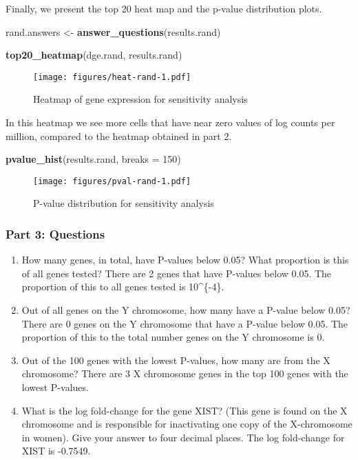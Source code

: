 \documentclass[]{article}
\newenvironment{Shaded}{\begin{snugshade}}{\end{snugshade}}
\newcommand{\KeywordTok}[1]{\textcolor[rgb]{0.13,0.29,0.53}{\textbf{{#1}}}}
\newcommand{\DataTypeTok}[1]{\textcolor[rgb]{0.13,0.29,0.53}{{#1}}}
\newcommand{\DecValTok}[1]{\textcolor[rgb]{0.00,0.00,0.81}{{#1}}}
\newcommand{\StringTok}[1]{\textcolor[rgb]{0.31,0.60,0.02}{{#1}}}
\newcommand{\NormalTok}[1]{{#1}}
\begin{document}
Finally, we present the top 20 heat map and the p-value distribution
plots.

\begin{Shaded}
\begin{Highlighting}[]
\NormalTok{rand.answers <-}\StringTok{ }\KeywordTok{answer_questions}\NormalTok{(results.rand)}
\end{Highlighting}
\end{Shaded}

\begin{Shaded}
\begin{Highlighting}[]
\KeywordTok{top20_heatmap}\NormalTok{(dge.rand, results.rand)}
\end{Highlighting}
\end{Shaded}

\begin{figure}[htbp]
\centering
\texttt{[image: figures/heat-rand-1.pdf]}
\caption{Heatmap of gene expression for sensitivity analysis}
\end{figure}

In this heatmap we see more cells that have near zero values of log
counts per million, compared to the heatmap obtained in part 2.

\begin{Shaded}
\begin{Highlighting}[]
\KeywordTok{pvalue_hist}\NormalTok{(results.rand, }\DataTypeTok{breaks =} \DecValTok{150}\NormalTok{)}
\end{Highlighting}
\end{Shaded}

\begin{figure}[htbp]
\centering
\texttt{[image: figures/pval-rand-1.pdf]}
\caption{P-value distribution for sensitivity analysis}
\end{figure}

\subsubsection{Part 3: Questions}\label{part-3-questions}

\begin{enumerate}
\def\labelenumi{\arabic{enumi}.}
\item
  How many genes, in total, have P-values below 0.05? What proportion is
  this of all genes tested? There are 2 genes that have P-values below
  0.05. The proportion of this to all genes tested is 10\^{}\{-4\}.
\item
  Out of all genes on the Y chromosome, how many have a P-value below
  0.05? There are 0 genes on the Y chromosome that have a P-value below
  0.05. The proportion of this to the total number genes on the Y
  chromosome is 0.
\item
  Out of the 100 genes with the lowest P-values, how many are from the X
  chromosome? There are 3 X chromosome genes in the top 100 genes with
  the lowest P-values.
\item
  What is the log fold-change for the gene XIST? (This gene is found on
  the X chromosome and is responsible for inactivating one copy of the
  X-chromosome in women). Give your answer to four decimal places. The
  log fold-change for XIST is -0.7549.
\end{enumerate}
\end{document}
